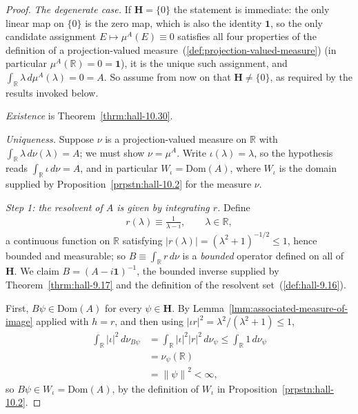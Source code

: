\begin{proof}
    \leanok
\textit{The degenerate case.} If $\mathbf{H} = \{0\}$ the statement is immediate: the only linear map on $\{0\}$ is the zero map, which is also the identity $\mathbf{1}$, so the only candidate assignment $E \mapsto \mu^A(E) \equiv 0$ satisfies all four properties of the definition of a projection-valued measure~(\ref{def:projection-valued-measure}) (in particular $\mu^A(\mathbb{R}) = 0 = \mathbf{1}$), it is the unique such assignment, and $\int_{\mathbb{R}}\lambda\,d\mu^A(\lambda) = 0 = A$. So assume from now on that $\mathbf{H} \ne \{0\}$, as required by the results invoked below.

\textit{Existence} is Theorem~\ref{thrm:hall-10.30}.

\textit{Uniqueness.} Suppose $\nu$ is a projection-valued measure on $\mathbb{R}$ with $\int_{\mathbb{R}} \lambda \, d\nu(\lambda) = A$; we must show $\nu = \mu^A$. Write $\iota(\lambda) = \lambda$, so the hypothesis reads $\int_{\mathbb{R}} \iota \, d\nu = A$, and in particular $W_\iota = \text{Dom}(A)$, where $W_\iota$ is the domain supplied by Proposition~\ref{prpstn:hall-10.2} for the measure $\nu$.

\textit{Step 1: the resolvent of $A$ is given by integrating $r$.} Define
\begin{align}
    r(\lambda) \equiv \frac{1}{\lambda - i}, \qquad \lambda \in \mathbb{R},
\end{align}
a continuous function on $\mathbb{R}$ satisfying $\lvert r(\lambda) \rvert = (\lambda^2+1)^{-1/2} \le 1$, hence bounded and measurable; so $B \equiv \int_{\mathbb{R}} r \, d\nu$ is a \textit{bounded} operator defined on all of $\mathbf{H}$. We claim $B = (A - i\mathbf{1})^{-1}$, the bounded inverse supplied by Theorem~\ref{thrm:hall-9.17} and the definition of the resolvent set~(\ref{def:hall-9.16}).

First, $B\psi \in \text{Dom}(A)$ for every $\psi \in \mathbf{H}$. By Lemma~\ref{lmm:associated-measure-of-image} applied with $h = r$, and then using $\lvert \iota r \rvert^2 = \lambda^2/(\lambda^2+1) \le 1$,
\begin{align}
    \int_{\mathbb{R}} \lvert \iota \rvert^2 \, d\nu_{B\psi} &= \int_{\mathbb{R}} \lvert \iota \rvert^2 \lvert r \rvert^2 \, d\nu_\psi \le \int_{\mathbb{R}} 1 \, d\nu_\psi \\
                &= \nu_\psi(\mathbb{R}) \\
                &= \left\| \psi \right\|^2 < \infty,
\end{align}
so $B\psi \in W_\iota = \text{Dom}(A)$, by the definition of $W_\iota$ in Proposition~\ref{prpstn:hall-10.2}.


\end{proof}
